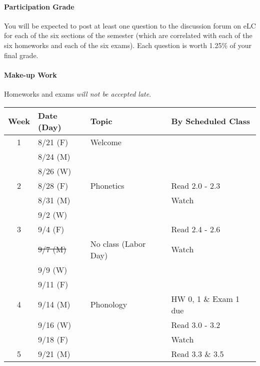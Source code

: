 \documentclass{article}
\newcommand{\rowvspace}{\rule{0pt}{14pt}}
\begin{document}
  \paragraph{Participation Grade}
    You will be expected to post at least one question to the discussion forum on eLC for each of the six sections of the semester (which are correlated with each of the six homeworks and each of the six exams). Each question is worth 1.25\% of your final grade.

  \paragraph{Make-up Work}
    Homeworks and exams \emph{will not be accepted late}.

    \begin{longtable}{c l l | l}
      Week  & Date (Day)  & Topic                           & By Scheduled Class \\
      \hline
      \hline
      1     & 8/21 (F)    & Welcome \rowvspace              & \\
            & 8/24 (M)    &                                 & \\
            & 8/26 (W)    &                                 & \\
      \hline
      2     & 8/28 (F)    & Phonetics                       & Read 2.0 - 2.3\\
            & 8/31 (M)    &                                 & Watch\\
            & 9/2  (W)    &                                 & \\
      \hline
      3     & 9/4  (F)    &                                 & Read 2.4 - 2.6\\
            & \sout{9/7  (M)} & No class (Labor Day)            & Watch\\
            & 9/9  (W)    &                                 & \\
            & 9/11 (F)    &                                 & \\
      \hline
      4     & 9/14 (M)    & Phonology                       & HW 0, 1 \& Exam 1 due\\
            & 9/16 (W)    &                                 & Read 3.0 - 3.2\\
            & 9/18 (F)    &                                 & Watch\\
      \hline
      5     & 9/21 (M)    &                                 & Read 3.3 \& 3.5\\

\end{longtable}
\end{document}
